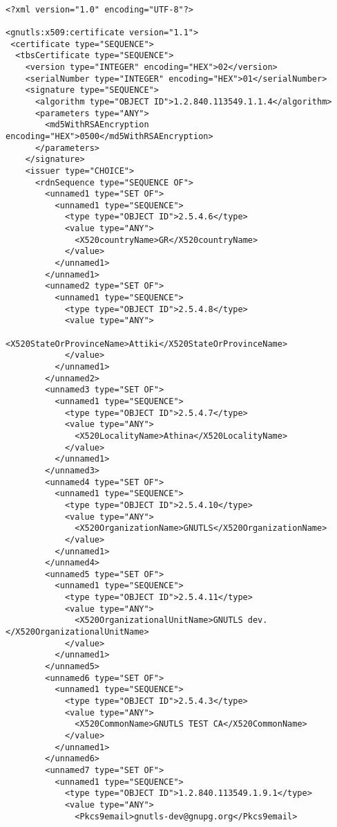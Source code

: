 \begin{verbatim}

<?xml version="1.0" encoding="UTF-8"?>

<gnutls:x509:certificate version="1.1">
 <certificate type="SEQUENCE">
  <tbsCertificate type="SEQUENCE">
    <version type="INTEGER" encoding="HEX">02</version>
    <serialNumber type="INTEGER" encoding="HEX">01</serialNumber>
    <signature type="SEQUENCE">
      <algorithm type="OBJECT ID">1.2.840.113549.1.1.4</algorithm>
      <parameters type="ANY">
        <md5WithRSAEncryption encoding="HEX">0500</md5WithRSAEncryption>
      </parameters>
    </signature>
    <issuer type="CHOICE">
      <rdnSequence type="SEQUENCE OF">
        <unnamed1 type="SET OF">
          <unnamed1 type="SEQUENCE">
            <type type="OBJECT ID">2.5.4.6</type>
            <value type="ANY">
              <X520countryName>GR</X520countryName>
            </value>
          </unnamed1>
        </unnamed1>
        <unnamed2 type="SET OF">
          <unnamed1 type="SEQUENCE">
            <type type="OBJECT ID">2.5.4.8</type>
            <value type="ANY">
              <X520StateOrProvinceName>Attiki</X520StateOrProvinceName>
            </value>
          </unnamed1>
        </unnamed2>
        <unnamed3 type="SET OF">
          <unnamed1 type="SEQUENCE">
            <type type="OBJECT ID">2.5.4.7</type>
            <value type="ANY">
              <X520LocalityName>Athina</X520LocalityName>
            </value>
          </unnamed1>
        </unnamed3>
        <unnamed4 type="SET OF">
          <unnamed1 type="SEQUENCE">
            <type type="OBJECT ID">2.5.4.10</type>
            <value type="ANY">
              <X520OrganizationName>GNUTLS</X520OrganizationName>
            </value>
          </unnamed1>
        </unnamed4>
        <unnamed5 type="SET OF">
          <unnamed1 type="SEQUENCE">
            <type type="OBJECT ID">2.5.4.11</type>
            <value type="ANY">
              <X520OrganizationalUnitName>GNUTLS dev.</X520OrganizationalUnitName>
            </value>
          </unnamed1>
        </unnamed5>
        <unnamed6 type="SET OF">
          <unnamed1 type="SEQUENCE">
            <type type="OBJECT ID">2.5.4.3</type>
            <value type="ANY">
              <X520CommonName>GNUTLS TEST CA</X520CommonName>
            </value>
          </unnamed1>
        </unnamed6>
        <unnamed7 type="SET OF">
          <unnamed1 type="SEQUENCE">
            <type type="OBJECT ID">1.2.840.113549.1.9.1</type>
            <value type="ANY">
              <Pkcs9email>gnutls-dev@gnupg.org</Pkcs9email>

\end{verbatim}
